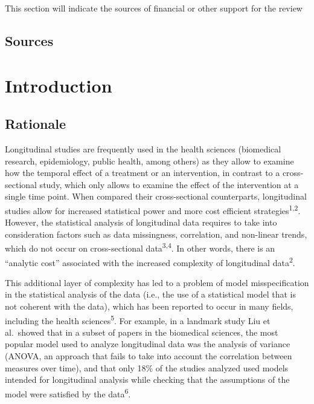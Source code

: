 \documentclass[
]{article}
\begin{document}
This section will indicate the sources of financial or other support for
the review

\hypertarget{sources}{%
\subsection{Sources}\label{sources}}

\hypertarget{introduction}{%
\section{Introduction}\label{introduction}}

\hypertarget{rationale}{%
\subsection{Rationale}\label{rationale}}

Longitudinal studies are frequently used in the health sciences
(biomedical research, epidemiology, public health, among others) as they
allow to examine how the temporal effect of a treatment or an
intervention, in contrast to a cross-sectional study, which only allows
to examine the effect of the intervention at a single time point. When
compared their cross-sectional counterparts, longitudinal studies allow
for increased statistical power and more cost efficient
strategies\textsuperscript{1,2}. However, the statistical analysis of
longitudinal data requires to take into consideration factors such as
data missingness, correlation, and non-linear trends, which do not occur
on cross-sectional data\textsuperscript{3,4}. In other words, there is
an ``analytic cost'' associated with the increased complexity of
longitudinal data\textsuperscript{2}.

This additional layer of complexity has led to a problem of model
misspecification in the statistical analysis of the data (i.e., the use
of a statistical model that is not coherent with the data), which has
been reported to occur in many fields, including the health
sciences\textsuperscript{5}. For example, in a landmark study Liu et
al.~showed that in a subset of papers in the biomedical sciences, the
most popular model used to analyze longitudinal data was the analysis of
variance (ANOVA, an approach that fails to take into account the
correlation between measures over time), and that only 18\% of the
studies analyzed used models intended for longitudinal analysis while
checking that the assumptions of the model were satisfied by the
data\textsuperscript{6}.
\end{document}
